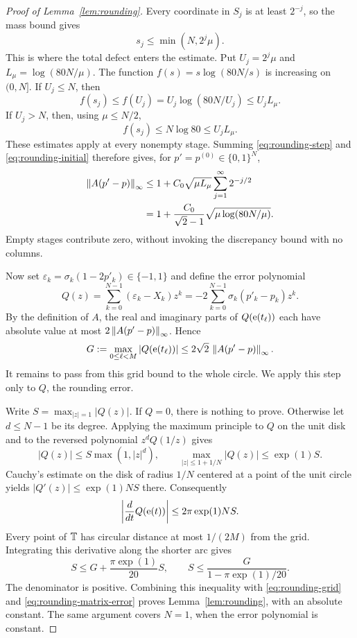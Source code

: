\begin{proof}[Proof of Lemma~\ref{lem:rounding}]
Every coordinate in $S_j$ is at least $2^{-j}$, so the mass bound gives
\[
 s_j\le\min(N,2^j\mu).
\]
This is where the total defect enters the estimate.  Put
$U_j=2^j\mu$ and $L_\mu=\log(80N/\mu)$.  The function
$f(s)=s\log(80N/s)$ is increasing on $(0,N]$.  If $U_j\le N$, then
\[
 f(s_j)\le f(U_j)
 =U_j\log(80N/U_j)\le U_jL_\mu.
\]
If $U_j>N$, then, using $\mu\le N/2$,
\[
 f(s_j)\le N\log80\le U_jL_\mu.
\]
These estimates apply at every nonempty stage.  Summing
\eqref{eq:rounding-step} and \eqref{eq:rounding-initial} therefore gives,
for $p'=p^{(0)}\in\{0,1\}^N$,
\begin{equation}\label{eq:rounding-matrix-error}
 \begin{aligned}
 \left\lVert A(p'-p)\right\rVert_\infty
 &\le1+C_0\sqrt{\mu L_\mu}\sum_{j=1}^{\infty}2^{-j/2}\\
 &=1+\frac{C_0}{\sqrt2-1}\sqrt{\mu\log(80N/\mu)}.
 \end{aligned}
\end{equation}
Empty stages contribute zero, without invoking the discrepancy bound
with no columns.

Now set $\varepsilon_k=\sigma_k(1-2p'_k)\in\{-1,1\}$ and define the
error polynomial
\[
 Q(z)=\sum_{k=0}^{N-1}(\varepsilon_k-X_k)z^k
     =-2\sum_{k=0}^{N-1}\sigma_k(p'_k-p_k)z^k.
\]
By the definition of $A$, the real and imaginary parts of
$Q(\mathrm e(t_\ell))$ each have absolute value at most
$2\left\lVert A(p'-p)\right\rVert_\infty$.  Hence
\begin{equation}\label{eq:rounding-grid}
 G:=\max_{0\le\ell<M}|Q(\mathrm e(t_\ell))|
 \le2\sqrt2\,\left\lVert A(p'-p)\right\rVert_\infty.
\end{equation}
It remains to pass from this grid bound to the whole circle.  We apply
this step only to $Q$, the rounding error.

Write $S=\max_{|z|=1}|Q(z)|$.  If $Q=0$, there is nothing to prove.
Otherwise let $d\le N-1$ be its degree.  Applying the maximum principle
to $Q$ on the unit disk and to the reversed polynomial $z^dQ(1/z)$ gives
\[
 |Q(z)|\le S\max(1,|z|^d),
 \qquad
 \max_{|z|\le1+1/N}|Q(z)|\le \exp(1)S.
\]
Cauchy's estimate on the disk of radius $1/N$ centered at a point of
the unit circle yields $|Q'(z)|\le\exp(1)NS$ there.  Consequently
\[
 \left|\frac{d}{dt}Q(\mathrm e(t))\right|
 \le2\pi\exp(1)NS.
\]
Every point of $\mathbb T$ has circular distance at most $1/(2M)$ from the
grid.  Integrating this derivative along the shorter arc gives
\[
 S\le G+\frac{\pi\exp(1)}{20}S,
 \qquad
 S\le\frac{G}{1-\pi\exp(1)/20}.
\]
The denominator is positive.  Combining this inequality with
\eqref{eq:rounding-grid} and \eqref{eq:rounding-matrix-error} proves
Lemma~\ref{lem:rounding}, with an absolute constant.  The same argument
covers $N=1$, when the error polynomial is constant.
\end{proof}
